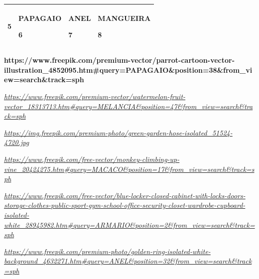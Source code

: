 \begin{escola}
\begin{longtable}[]{@{}llll@{}}
\begin{minipage}[t]{0.24\columnwidth}
5\strut
\end{minipage} & \begin{minipage}[t]{0.24\columnwidth}\raggedright\strut
PAPAGAIO

6\strut
\end{minipage} & \begin{minipage}[t]{0.24\columnwidth}\raggedright\strut
ANEL

7\strut
\end{minipage} & \begin{minipage}[t]{0.24\columnwidth}\raggedright\strut
MANGUEIRA

8\strut
\end{minipage}\tabularnewline
\bottomrule
\end{longtable}

\textbf{https://www.freepik.com/premium-vector/parrot-cartoon-vector-illustration\_4852095.htm\#query=PAPAGAIO\&position=38\&from\_view=search\&track=sph}

\href{https://www.freepik.com/premium-vector/watermelon-fruit-vector_18313713.htm\#query=MELANCIA\&position=47\&from_view=search\&track=sph}{\emph{https://www.freepik.com/premium-vector/watermelon-fruit-vector\_18313713.htm\#query=MELANCIA\&position=47\&from\_view=search\&track=sph}}

\href{https://img.freepik.com/premium-photo/green-garden-hose-isolated_51524-4720.jpg}{\emph{https://img.freepik.com/premium-photo/green-garden-hose-isolated\_51524-4720.jpg}}

\href{https://www.freepik.com/free-vector/monkey-climbing-up-vine_20424275.htm\#query=MACACO\&position=17\&from_view=search\&track=sph}{\emph{https://www.freepik.com/free-vector/monkey-climbing-up-vine\_20424275.htm\#query=MACACO\&position=17\&from\_view=search\&track=sph}}

\href{https://www.freepik.com/free-vector/blue-locker-closed-cabinet-with-locks-doors-storage-clothes-public-sport-gym-school-office-security-closet-wardrobe-cupboard-isolated-white_28945982.htm\#query=ARMARIO\&position=2\&from_view=search\&track=sph}{\emph{https://www.freepik.com/free-vector/blue-locker-closed-cabinet-with-locks-doors-storage-clothes-public-sport-gym-school-office-security-closet-wardrobe-cupboard-isolated-white\_28945982.htm\#query=ARMARIO\&position=2\&from\_view=search\&track=sph}}

\href{https://www.freepik.com/premium-photo/golden-ring-isolated-white-background_4632271.htm\#query=ANEL\&position=32\&from_view=search\&track=sph}{\emph{https://www.freepik.com/premium-photo/golden-ring-isolated-white-background\_4632271.htm\#query=ANEL\&position=32\&from\_view=search\&track=sph}}


\end{escola}
